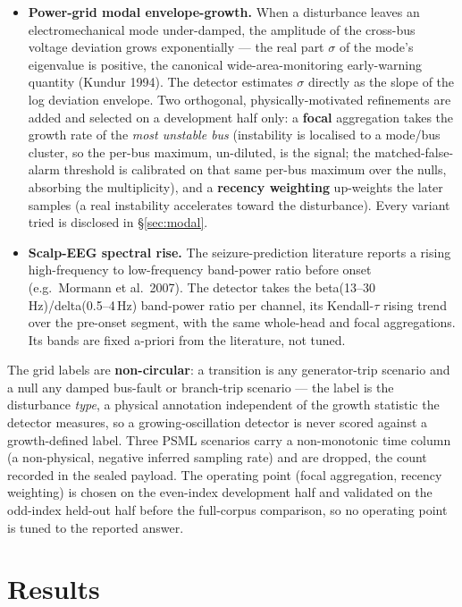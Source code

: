 \documentclass[11pt]{article}
\begin{document}
\begin{itemize}
  \item \textbf{Power-grid modal envelope-growth.} When a disturbance
    leaves an electromechanical mode under-damped, the amplitude of the
    cross-bus voltage deviation grows exponentially --- the real part
    $\sigma$ of the mode's eigenvalue is positive, the canonical
    wide-area-monitoring early-warning quantity (Kundur 1994). The
    detector estimates $\sigma$ directly as the slope of the log
    deviation envelope. Two orthogonal, physically-motivated refinements
    are added and selected on a development half only: a \textbf{focal}
    aggregation takes the growth rate of the \emph{most unstable bus}
    (instability is localised to a mode/bus cluster, so the per-bus
    maximum, un-diluted, is the signal; the matched-false-alarm
    threshold is calibrated on that same per-bus maximum over the nulls,
    absorbing the multiplicity), and a \textbf{recency weighting}
    up-weights the later samples (a real instability accelerates toward
    the disturbance). Every variant tried is disclosed in
    \S\ref{sec:modal}.
  \item \textbf{Scalp-EEG spectral rise.} The seizure-prediction
    literature reports a rising high-frequency to low-frequency
    band-power ratio before onset (e.g.\ Mormann et al.\ 2007). The
    detector takes the beta(13--30\,Hz)/delta(0.5--4\,Hz) band-power
    ratio per channel, its Kendall-$\tau$ rising trend over the
    pre-onset segment, with the same whole-head and focal aggregations.
    Its bands are fixed a-priori from the literature, not tuned.
\end{itemize}

The grid labels are \textbf{non-circular}: a transition is any
generator-trip scenario and a null any damped bus-fault or branch-trip
scenario --- the label is the disturbance \emph{type}, a physical
annotation independent of the growth statistic the detector measures, so
a growing-oscillation detector is never scored against a growth-defined
label. Three PSML scenarios carry a non-monotonic time column (a
non-physical, negative inferred sampling rate) and are dropped, the
count recorded in the sealed payload. The operating point (focal
aggregation, recency weighting) is chosen on the even-index development
half and validated on the odd-index held-out half before the
full-corpus comparison, so no operating point is tuned to the reported
answer.

\section{Results}\label{sec:results}
\end{document}
